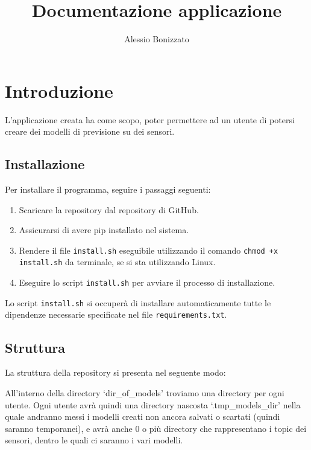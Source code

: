 \documentclass[a4paper,10pt]{article}
\begin{document}
\title{Documentazione applicazione}
\author{Alessio Bonizzato}
\date{}
\maketitle %

\section{Introduzione}
L'applicazione creata ha come scopo, poter permettere ad un utente di potersi creare dei modelli di previsione su dei sensori. 

\subsection{Installazione}
Per installare il programma, seguire i passaggi seguenti:

\begin{enumerate}
  \item Scaricare la repository dal repository di GitHub.
  \item Assicurarsi di avere pip installato nel sistema.
  \item Rendere il file \texttt{install.sh} eseguibile utilizzando il comando \texttt{chmod +x install.sh} da terminale, se si sta utilizzando Linux.
  \item Eseguire lo script \texttt{install.sh} per avviare il processo di installazione.
\end{enumerate}

Lo script \texttt{install.sh} si occuperà di installare automaticamente tutte le dipendenze necessarie specificate nel file \texttt{requirements.txt}.

\subsection{Struttura}
La struttura della repository si presenta nel seguente modo:



All'interno della directory `dir\_of\_models' troviamo una directory per ogni utente. Ogni utente avrà quindi una directory nascosta `.tmp\_models\_dir' nella quale andranno messi i modelli creati non ancora salvati o scartati (quindi saranno temporanei), e avrà anche 0 o più directory che rappresentano i topic dei sensori, dentro le quali ci saranno i vari modelli.
\end{document}
